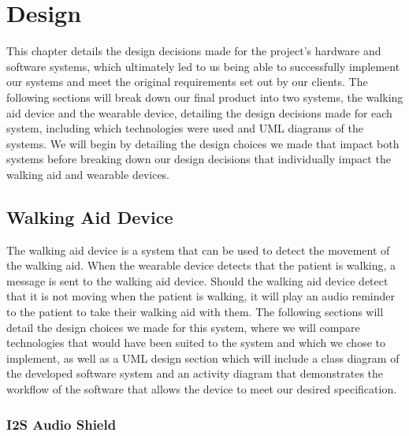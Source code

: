 \chapter{Design}
        \label{ch:design}
        
            This chapter details the design decisions made for the project's hardware and software systems, which ultimately led to us being able to successfully implement our systems and meet the original requirements set out by our clients. The following sections will break down our final product into two systems, the walking aid device and the wearable device, detailing the design decisions made for each system, including which technologies were used and UML diagrams of the systems. We will begin by detailing the design choices we made that impact both systems before breaking down our design decisions that individually impact the walking aid and wearable devices.
        
            \section{Walking Aid Device}
            \label{sec:walking_aid}
        
                The walking aid device is a system that can be used to detect the movement of the walking aid. When the wearable device detects that the patient is walking, a message is sent to the walking aid device. Should the walking aid device detect that it is not moving when the patient is walking, it will play an audio reminder to the patient to take their walking aid with them. The following sections will detail the design choices we made for this system, where we will compare technologies that would have been suited to the system and which we chose to implement, as well as a UML design section which will include a class diagram of the developed software system and an activity diagram that demonstrates the workflow of the software that allows the device to meet our desired specification.
        
                \subsection{I2S Audio Shield}
                \label{subsec:i2s_audio_shield}
        
